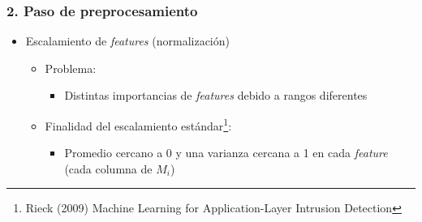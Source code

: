 \begin{frame}
    \frametitle{2. Paso de preprocesamiento}

    \begin{itemize}
        \item
        Escalamiento de \textit{features} (normalización)

        \begin{itemize}
            \item<2->
            Problema:

            \begin{itemize}[<2->]
                \item
                Distintas importancias de \textit{features} debido a
                rangos diferentes
            \end{itemize}

            \item<3->
            Finalidad del escalamiento estándar\footnote{Rieck (2009) Machine
                Learning for Application-Layer Intrusion Detection}:

            \begin{itemize}[<3->]
                \item
                Promedio cercano a 0 y una varianza cercana a 1 en cada
                \textit{feature} (cada columna de $M_{i}$)
            \end{itemize}
        \end{itemize}
    \end{itemize}

\end{frame}

